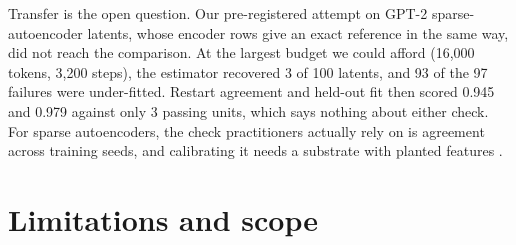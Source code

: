 \documentclass[10pt]{article}
\begin{document}
Transfer is the open question. Our pre-registered attempt on GPT-2 sparse-autoencoder latents,
whose encoder rows give an exact reference in the same way, did not reach the comparison. At
the largest budget we could afford (16{,}000 tokens, 3{,}200 steps), the estimator recovered 3
of 100 latents, and 93 of the 97 failures were under-fitted. Restart agreement and held-out
fit then scored 0.945 and 0.979 against only 3 passing units, which says nothing about either
check. For sparse autoencoders, the check practitioners actually rely on is agreement across
training seeds, and calibrating it needs a substrate with planted features
\citep{chanin2026synthsaebench}.

\section{Limitations and scope}
\label{sec:limits}
\end{document}
